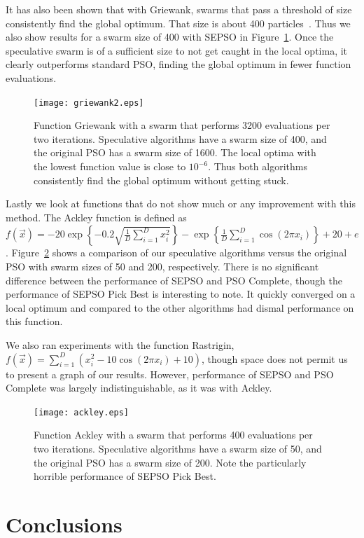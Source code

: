 \documentclass[conference,letterpaper]{IEEEtran}
\newcommand{\fig}[1]{Figure~\ref{fig:#1}}
\begin{document}
It has also been shown that with Griewank, swarms that pass a threshold of size
consistently find the global optimum.  That size is about 400
particles~\cite{mcnabb-cec09}.  Thus we also show results for a swarm size of
400 with SEPSO in \fig{griewank2}.  Once the speculative swarm is of a
sufficient size to not get caught in the local optima, it clearly outperforms
standard PSO, finding the global optimum in fewer function evaluations.

\begin{figure}
  \texttt{[image: griewank2.eps]}
  \caption{Function Griewank with a swarm that performs 3200 evaluations per
  two iterations.  Speculative algorithms have a swarm size of 400, and the
  original PSO has a swarm size of 1600.  The local optima with the lowest
  function value is close to $10^{-6}$.  Thus both algorithms consistently find
  the global optimum without getting stuck.}
  \label{fig:griewank2}
\end{figure}

Lastly we look at functions that do not show much or any improvement with this
method.  The Ackley function is defined as $f(\Vec{x}) = -20\exp\left\{
-0.2\sqrt{\frac{1}{D}\sum_{i=1}^Dx_i^2}\right\} - \exp\left\{\frac{1}{D}
\sum_{i=1}^D\cos(2\pi x_i)\right\}+20+e$. \fig{ackley} shows a comparison of
our speculative algorithms versus the original PSO with swarm sizes of 50 and
200, respectively.  There is no significant difference between the performance
of SEPSO and PSO Complete, though the performance of SEPSO Pick Best is
interesting to note.  It quickly converged on a local optimum and compared to
the other algorithms had dismal performance on this function.

We also ran experiments with the function Rastrigin, $f(\Vec{x}) = \sum_{i=1}^D
\left(x_i^2 - 10\cos\left(2\pi x_i\right) + 10\right)$,  though space does not
permit us to present a graph of our results.  However, performance of SEPSO and
PSO Complete was largely indistinguishable, as it was with Ackley.

\begin{figure}
  \texttt{[image: ackley.eps]}
  \caption{Function Ackley with a swarm that performs 400 evaluations per
  two iterations.  Speculative algorithms have a swarm size of 50, and the
  original PSO has a swarm size of 200.  Note the particularly horrible
  performance of SEPSO Pick Best.}
  \label{fig:ackley}
\end{figure}


\section{Conclusions}
\label{sec:conclusion}
\end{document}
